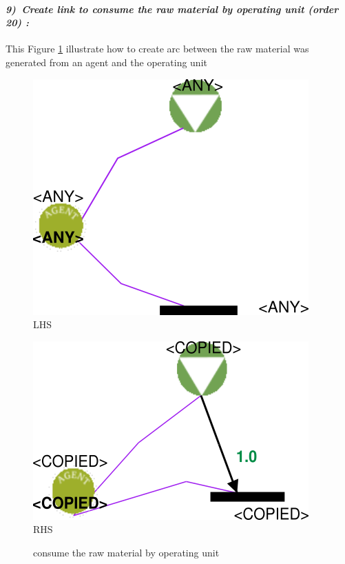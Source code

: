 \vspace{1cm}
\paragraph{\emph{9)~Create link to consume the raw material by operating unit  (order 20) :} }
 
 
This Figure \ref{fig:consume the raw material by operating unit}  illustrate  how to create arc between 
the raw material was generated from an agent and the operating unit

 
\vspace{1cm}
\begin{figure}[th]
\centering
\begin{minipage}{.5\textwidth}
  \begin{center}
  \includegraphics[width=.7\linewidth]{chapiter3/img/L9}
  LHS
  \end{center}
  
\end{minipage}%
\begin{minipage}{.5\textwidth}
  \begin{center}
  \includegraphics[width=.7\linewidth]{chapiter3/img/R9}
  RHS 
  \end{center}
\end{minipage}
\caption{\label{fig:consume the raw material by operating unit} consume the raw material by operating unit}
 
\end{figure}
\vspace{1cm}

